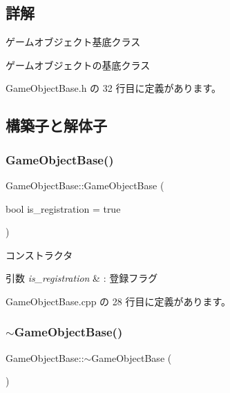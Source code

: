 \subsection{詳解}
ゲームオブジェクト基底クラス 

ゲームオブジェクトの基底クラス 

 Game\+Object\+Base.\+h の 32 行目に定義があります。



\subsection{構築子と解体子}
\mbox{\label{class_game_object_base_a4682a3e88a45a462de288f14e9a8545d}} 
\subsubsection{\texorpdfstring{Game\+Object\+Base()}{GameObjectBase()}}
{\footnotesize\ttfamily Game\+Object\+Base\+::\+Game\+Object\+Base (\begin{DoxyParamCaption}\item[{bool}]{is\+\_\+registration = {\ttfamily true} }\end{DoxyParamCaption})}



コンストラクタ 


\begin{DoxyParams}{引数}
{\em is\+\_\+registration} & \+: 登録フラグ \\
\hline
\end{DoxyParams}


 Game\+Object\+Base.\+cpp の 28 行目に定義があります。

\mbox{\label{class_game_object_base_a0cb813d5c7af673a3d190eb1b2d26275}} 
\subsubsection{\texorpdfstring{$\sim$\+Game\+Object\+Base()}{~GameObjectBase()}}
{\footnotesize\ttfamily Game\+Object\+Base\+::$\sim$\+Game\+Object\+Base (\begin{DoxyParamCaption}{ }\end{DoxyParamCaption})\hspace{0.3cm}{\ttfamily [virtual]}}



